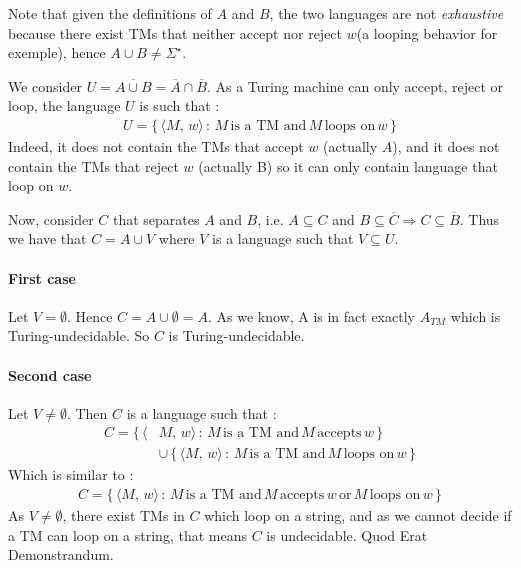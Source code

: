 \documentclass{article}
\begin{document}
Note that given the definitions of $A$ and $B$, the two languages are not \textit{exhaustive} because there exist TMs that neither accept nor reject $w$\linebreak (a looping behavior for exemple), hence $A\cup B \neq\Sigma^\star$.

We consider $U=\overline{A\cup B}= \overline{A}\cap\overline{B}$. As a Turing machine can only accept, reject or loop, the language $U$ is such that :
\begin{align*}
U=\{\,\langle M,\,w\rangle\,:\,M\,\text{is a TM and}\,M\,\text{loops on}\,w\,\}   
\end{align*}
Indeed, it does not contain the TMs that accept $w$ (actually $A$), and it does not contain the TMs that reject $w$ (actually B) so it can only contain language that loop on $w$.

Now, consider $C$ that separates $A$ and $B$, i.e. $A\subseteq C$ and $B\subseteq\overline{C}\Rightarrow C\subseteq\overline{B}$. Thus we have that $C=A\cup V$ where $V$ is a language such that $V\subseteq U$.
\paragraph{First case} Let $V=\emptyset$. Hence $C=A\cup\emptyset =A$. As we know, A is in fact exactly $A_{TM}$ which is Turing-undecidable. So $C$ is Turing-undecidable.
\paragraph{Second case} Let $V\neq\emptyset$. Then $C$ is a language such that :
\begin{align*}
C=\{\,\langle &M,\,w\rangle\,:\,M\,\text{is a TM and}\,M\,\text{accepts}\,w\,\}\\
&\cup\,\{\,\langle M,\,w\rangle\,:\,M\,\text{is a TM and}\,M\,\text{loops on}\,w\,\} 
\end{align*}
Which is similar to :
\begin{align*}
    C=\{\,\langle M,\,w\rangle\,:\,M\,\text{is a TM and}\,M\,\text{accepts}\,w\,\text{or}\,M\,\text{loops on}\,w\,\}
\end{align*}
As $V\neq\emptyset$, there exist TMs in $C$ which loop on a string, and as we cannot decide if a TM can loop on a string, that means $C$ is undecidable. Quod Erat Demonstrandum.\linebreak
\end{document}
